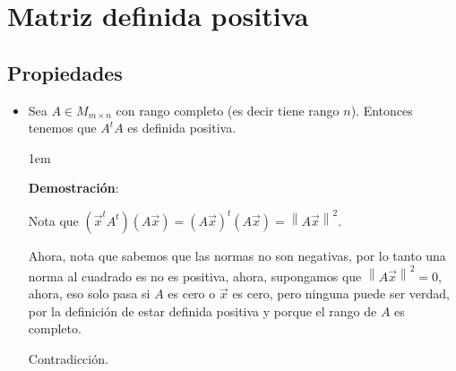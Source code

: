\documentclass[12pt, fleqn]{report}                             %
\newenvironment{SmallIndentation}[1][0.75em]                    %
        {\begin{adjustwidth}{#1}{}\begin{footnotesize}}             %
        {\end{footnotesize}\end{adjustwidth}}                       %
\theoremstyle{break}                                            %
\newcommand{\Abs}[1]    {\left\lVert #1 \right\lVert}           %
\begin{document}
        
        \clearpage
        \section{Matriz definida positiva}

            \vspace{1em}
            \subsection{Propiedades}

                \begin{itemize}
                    \item
                        Sea $A \in M_{m \times n}$ con rango completo (es decir tiene rango $n$).
                        Entonces tenemos que $A^t A$ es definida positiva.

                        \begin{SmallIndentation}[1em]
                            \textbf{Demostración}:
                        
                            Nota que $(\vec x^t A^t)(A \vec x) = (A \vec x)^t(A \vec x) = \Abs{A \vec x}^2$.

                            Ahora, nota que sabemos que las normas no son negativas, por lo tanto una norma al cuadrado
                            es no es positiva, ahora, supongamos que $\Abs{A \vec x}^2 = 0$, ahora, eso solo pasa
                            si $A$ es cero o $\vec x$ es cero, pero ninguna puede ser verdad, por la definición de
                            estar definida positiva y porque el rango de $A$ es completo.

                            Contradicción.

                        \end{SmallIndentation}
                \end{itemize}

\end{document}
